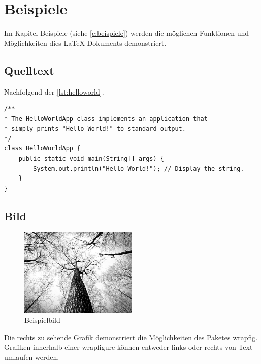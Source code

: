 \chapter{Beispiele} \label{c:beispiele}

Im Kapitel Beispiele (siehe \autoref{c:beispiele}) werden die möglichen Funktionen und Möglichkeiten dies LaTeX-Dokuments demonstriert.

\section{Quelltext}

Nachfolgend der \autoref{lst:helloworld}.

\begin{lstlisting}[caption={Hello World}, captionpos=b, label={lst:helloworld}]
/**
* The HelloWorldApp class implements an application that
* simply prints "Hello World!" to standard output.
*/
class HelloWorldApp {
	public static void main(String[] args) {
		System.out.println("Hello World!"); // Display the string.
	}
}
\end{lstlisting}

\section{Bild}

\begin{figure}
	\centering
	\includegraphics[width=0.5\textwidth]{resources/example}
	\caption{Beispielbild {\cite{PEXELS2015}}}
\end{figure}

Die rechts zu sehende Grafik demonstriert die Möglichkeiten des Paketes \glqq wrapfig\grqq . Grafiken innerhalb einer \glqq wrapfigure\grqq{} können entweder links oder rechts von Text umlaufen werden.

